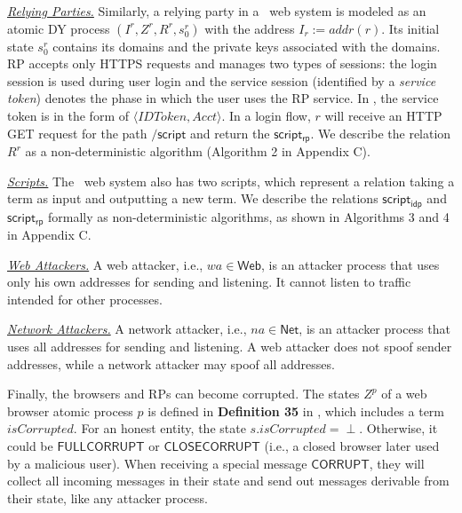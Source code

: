 \vspace{1mm}\noindent \underline{\em Relying Parties.} Similarly, a relying party in a \usso\ web system is modeled as an atomic DY process $(I^r, Z^r, R^r, s_0^r)$ with the address $I_r:=addr(r)$. Its initial state $s_0^r$ contains its domains and the private keys associated with the domains. RP accepts only HTTPS requests and manages two types of sessions: the login session is used during user login and the service session (identified by a {\em service token}) denotes the phase in which the user uses the RP service. In \usso, the service token is in the form of $\langle IDToken, Acct \rangle$. In a login flow, $r$ will receive an HTTP GET request for the path $\mathsf{/script}$ and return the $\mathsf{script_{rp}}$. We describe the relation $R^r$ as a non-deterministic algorithm (Algorithm 2 in Appendix C). 

\vspace{1mm}\noindent \underline{\em Scripts.} The \usso\ web system also has two scripts, which represent a relation taking a term as input and outputting a new term. We describe the relations $\mathsf{script_{idp}}$ and $\mathsf{script_{rp}}$ formally as non-deterministic algorithms, as shown in Algorithms 3 and 4 in Appendix C.

\vspace{1mm}\noindent \underline{\em Web Attackers.} A web attacker, i.e., $wa \in \textsf{Web}$, is an attacker process that uses only his own addresses for sending and listening. It cannot listen to traffic intended for other processes. 

\vspace{1mm}\noindent \underline{\em Network Attackers.} A network attacker, i.e., $na \in \textsf{Net}$, is an attacker process that uses all addresses for sending and listening. 
A web attacker does not spoof sender addresses, while a network attacker may spoof all addresses. 

Finally, the browsers and RPs can become corrupted. The states $Z^p$ of a web browser atomic process $p$ is defined in {\bf Definition 35} in \cite{SPRESSO}, which includes a term $isCorrupted$. For an honest entity, the state $s.isCorrupted=\perp$. Otherwise, it could be $\textsf{FULLCORRUPT}$ or $\textsf{CLOSECORRUPT}$ (i.e., a closed browser later used by a malicious user). When receiving a special message $\mathsf{CORRUPT}$, they will collect all incoming messages in their state and send out messages derivable from their state, like any attacker process.

